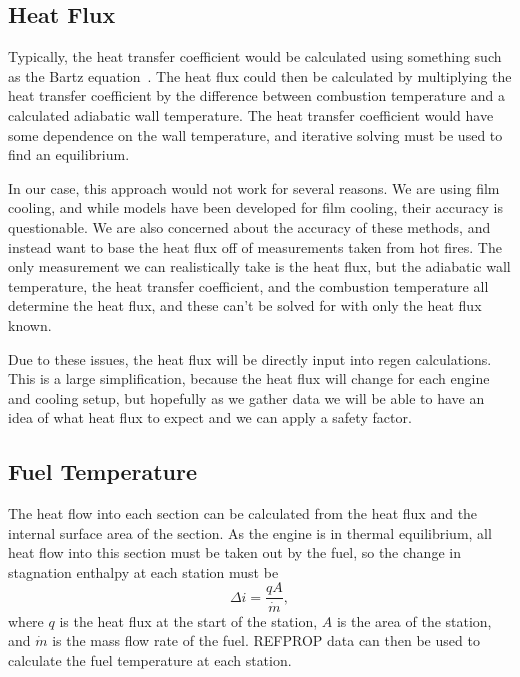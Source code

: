 \documentclass[11pt]{article}
\begin{document}
\subsection{Heat Flux}
Typically, the heat transfer coefficient would be calculated using something such as the Bartz equation~\cite{bartz_turbulent_1965}. The heat flux could then be calculated by multiplying the heat transfer coefficient by the difference between combustion temperature and a calculated adiabatic wall temperature. The heat transfer coefficient would have some dependence on the wall temperature, and iterative solving must be used to find an equilibrium.

In our case, this approach would not work for several reasons. We are using film cooling, and while models have been developed for film cooling, their accuracy is questionable. We are also concerned about the accuracy of these methods, and instead want to base the heat flux off of measurements taken from hot fires. The only measurement we can realistically take is the heat flux, but the adiabatic wall temperature, the heat transfer coefficient, and the combustion temperature all determine the heat flux, and these can't be solved for with only the heat flux known.

Due to these issues, the heat flux will be directly input into regen calculations. This is a large simplification, because the heat flux will change for each engine and cooling setup, but hopefully as we gather data we will be able to have an idea of what heat flux to expect and we can apply a safety factor.

\subsection{Fuel Temperature}
The heat flow into each section can be calculated from the heat flux and the internal surface area of the section. As the engine is in thermal equilibrium, all heat flow into this section must be taken out by the fuel, so the change in stagnation enthalpy at each station must be~\cite{naraghi_simple_2008}
\begin{equation}
  \Delta i = \frac{q A}{\dot{m}},
\end{equation}
where $q$ is the heat flux at the start of the station, $A$ is the area of the station, and $\dot{m}$ is the mass flow rate of the fuel. REFPROP data can then be used to calculate the fuel temperature at each station.
\end{document}
